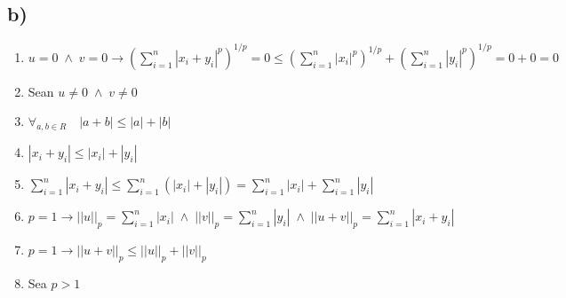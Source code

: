 \subsection*{b)}

\begin{enumerate}
	\item $u=0 \; \wedge \; v=0 \to \left( \sum_{i=1}^n |x_i + y_i|^p \right)^{1/p} = 0 \leq \left( \sum_{i=1}^n |x_i|^p \right)^{1/p} + \left( \sum_{i=1}^n |y_i|^p \right)^{1/p} = 0 + 0 = 0$ 
	\item Sean $u \neq 0 \; \wedge \; v \neq 0$
	\item $\forall_{a,b \in R} \quad |a + b| \leq |a| + |b|$
	\item $|x_i + y_i| \leq |x_i| + |y_i|$
	\item $\sum_{i=1}^n |x_i + y_i| \leq \sum_{i=1}^n \left( |x_i| + |y_i| \right) = \sum_{i=1}^n |x_i| + \sum_{i=1}^n |y_i|$
	\item $p = 1 \to ||u||_p = \sum_{i=1}^n |x_i| \;  \wedge \; ||v||_p = \sum_{i=1}^n |y_i| \;  \wedge \; ||u + v||_p = \sum_{i=1}^n |x_i + y_i|$
	\item $p = 1 \to ||u + v||_p \leq ||u||_p + ||v||_p$
	\item Sea $p > 1$


\end{enumerate}
